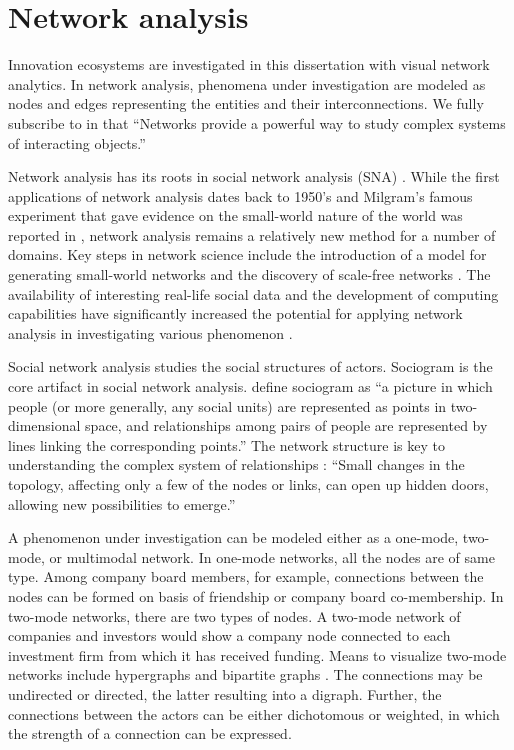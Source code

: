 \section{Network analysis}
\label{sec:networkanalysis}

Innovation ecosystems are investigated in this dissertation with visual network analytics. In network analysis, phenomena under investigation are modeled as nodes and edges representing the entities and their interconnections. We fully subscribe to \cite{Yang2014OverlappingNetworks} in that ``Networks provide a powerful way to study complex systems of interacting objects.'' 
 
Network analysis has its roots in social network analysis (SNA) \citep{Moreno1953,Wasserman1994SocialApplications}. While the first applications of network analysis dates back to 1950's and Milgram's famous experiment that gave evidence on the small-world nature of the world was reported in \citeyear{Milgram1967TheProblem} \citep{Milgram1967TheProblem}, network analysis remains a relatively new method for a number of domains. Key steps in network science include the introduction of a model for generating small-world networks \citep{Watts1998,Watts1999} and the discovery of scale-free networks \citep{Barabasi1999EmergenceNetworks}. The availability of interesting real-life social data and the development of computing capabilities have significantly increased the potential for applying network analysis in investigating various phenomenon \citep[cf.][]{Cioffi-Revilla2010ComputationalScience, Lazer2009ComputationalScience, Hansen2011AnalyzingWorld, Bastian2009Gephi:Networks}.

Social network analysis studies the social structures of actors. Sociogram is the core artifact in social network analysis. \cite{Wasserman1994SocialApplications} define sociogram as ``a picture in which people (or more generally, any social units) are represented as points in two-dimensional space, and relationships among pairs of people are represented by lines linking the corresponding points.'' The network structure is key to understanding the complex system of relationships \citep{Barabasi2003Linked:Means}: ``Small changes in the topology, affecting only a few of the nodes or links, can open up hidden doors, allowing new possibilities to emerge.''

A phenomenon under investigation can be modeled either as a one-mode, two-mode, or multimodal network. In one-mode networks, all the nodes are of same type. Among company board members, for example, connections between the nodes can be formed on basis of friendship or company board co-membership. In two-mode networks, there are two types of nodes. A two-mode network of companies and investors would show a company node connected to each investment firm from which it has received funding. Means to visualize two-mode networks include hypergraphs and bipartite graphs \citep{Freeman2000VisualizingNetworks, Jesus2009}. The connections may be undirected or directed, the latter resulting into a digraph. Further, the connections between the actors can be either dichotomous or weighted, in which the strength of a connection can be expressed.

